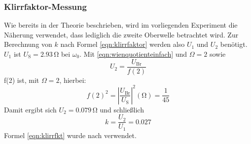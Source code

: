 \subsubsection{Klirrfaktor-Messung}
Wie bereits in der Theorie beschrieben, wird im vorliegenden Experiment die Näherung
verwendet, dass lediglich die zweite Oberwelle betrachtet wird.
Zur Berechnung von $k$ nach Formel \eqref{eqn:klirrfaktor} werden also $U_1$ und $U_2$ benötigt. $U_1$ ist $U_\text{S}=2.93 \,\si{\ohm}$ bei $\omega_0$. Mit \eqref{eqn:wienquotienteinfach} und $\Omega=2$ sowie
\begin{equation}
	\label{eqn:klirrfkt}
U_2=\frac{U_{\text{Br}}}{f(2)}
\end{equation}
f(2) ist, mit $\Omega=2$, hierbei:
\begin{equation}
f(2)^2=\left|\frac{U_{\text{Br}}}{U_\text{S}}\right|^2(\si{\ohm})=\frac{1}{45}
\end{equation}
Damit ergibt sich $U_2=0.079 \,\si{\ohm}$ und schließlich
\begin{equation}
k=\frac{U_2}{U_1}=0.027
\end{equation}
Formel \eqref{eqn:klirrfkt} wurde nach \cite{Anleitung} verwendet.
